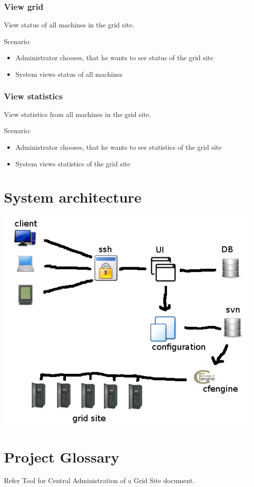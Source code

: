 \documentclass{article}
\begin{document}
\subsubsection{View grid}
View status of all machines in the grid site.

Scenario:
\begin{itemize}
\item{Administrator chooses, that he wants to see status of the grid site}
\item{System views status of all machines}
\end{itemize}

\subsubsection{View statistics}
View statistics from all machines in the grid site.

Scenario:
\begin{itemize}
\item{Administrator chooses, that he wants to see statistics of the grid site}
\item{ System views statistics of the grid site}
\end{itemize}

\section{System architecture}

\includegraphics[width=\linewidth]{arch.png}

\section{Project Glossary}

Refer Tool for Central Administration of a Grid Site document.
\end{document}
